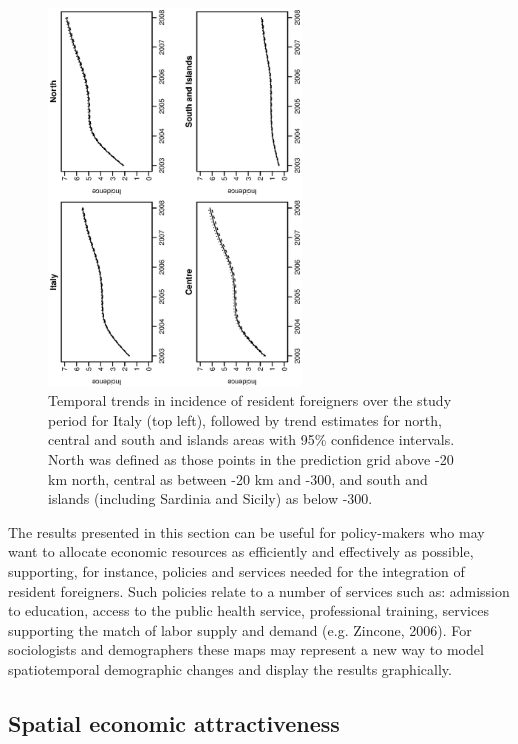 \documentclass[12pt]{article}
\theoremstyle{definition}
\theoremstyle{plain}
\begin{document}
\begin{figure}[tbp]
	\centering
		\includegraphics[width=0.6\textwidth, angle=270]{trends.ps}
	\caption{Temporal trends in incidence of resident foreigners over the study period for Italy (top left), followed by trend estimates for north, central and south and islands areas with 95\% confidence intervals. North was defined as those points in the prediction grid above -20 km north, central as between -20 km and -300, and south and islands (including Sardinia and Sicily) as below -300.}
	\label{trends}
\end{figure}

The results presented in this section can be useful for policy-makers who may want to allocate economic resources as efficiently and effectively as possible, supporting, for instance, policies and services needed for the integration of resident foreigners. Such policies relate to a number of services such as: admission to education, access to the public health service, professional training, services supporting the match of labor supply and demand (e.g. Zincone, 2006). For sociologists and demographers these maps may represent a new way to model spatiotemporal demographic changes and display the results graphically. 

\subsection{Spatial economic attractiveness \label{diss}}
\end{document}
